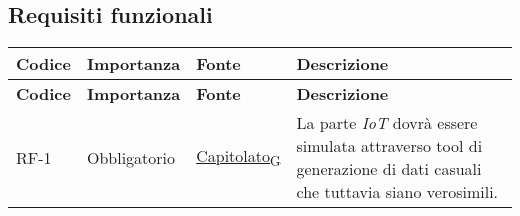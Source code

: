 \pagebreak
\subsection{Requisiti funzionali}
\begin{longtable}{|>{\centering\arraybackslash}m{}|>{\centering\arraybackslash}m{}|>{\centering\arraybackslash}m{}|>{\centering\arraybackslash}m{}|}
	\hline
	\textbf{Codice} & \textbf{Importanza} & \textbf{Fonte}                                                                                                    & \textbf{Descrizione}                                                                                                                                                                                                                                                                                                                                                                                                                                                                                                                                                                                                                                                                                                                                                                                  \\\hline
	\endfirsthead
	\hline
	\textbf{Codice} & \textbf{Importanza} & \textbf{Fonte}                                                                                                    & \textbf{Descrizione}                                                                                                                                                                                                                                                                                                                                                                                                                                                                                                                                                                                                                                                                                                                                                                                  \\\hline
	\endhead
	\hline
	RF-1            & Obbligatorio        & \href{https://7last.github.io/docs/pb/documentazione-interna/glossario\#capitolato}{Capitolato\textsubscript{G}} & La parte \textit{IoT} dovrà essere simulata attraverso tool di generazione di dati casuali che tuttavia siano verosimili.

\end{longtable}
